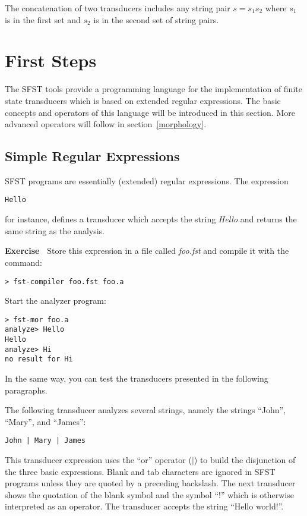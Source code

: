 \documentclass[11pt]{article}
\newenvironment{exercise}{

  \hrulefill\nopagebreak

  \textbf{Exercise~}}
{

  \nopagebreak\hrulefill\vspace{0.2cm}

}
\begin{document}
The concatenation of two transducers includes any string pair
$s=s_1s_2$ where $s_1$ is in the first set and $s_2$ is in the second
set of string pairs.


\section{First Steps\label{steps}}

The SFST tools provide a programming language for the implementation
of finite state transducers which is based on extended regular
expressions. The basic concepts and operators of this language will be
introduced in this section. More advanced operators will follow in
section~\ref{morphology}.


\subsection{Simple Regular Expressions}

SFST programs are essentially (extended) regular expressions. The expression

\begin{verbatim}
Hello
\end{verbatim}

for instance, defines a transducer which accepts the string
\emph{Hello} and returns the same string as the analysis.

\begin{exercise}
  Store this expression in a file called \emph{foo.fst} and compile it
with the command:

\begin{verbatim}
> fst-compiler foo.fst foo.a
\end{verbatim}

Start the analyzer program:

\begin{verbatim}
> fst-mor foo.a
analyze> Hello
Hello
analyze> Hi
no result for Hi
\end{verbatim}

In the same way, you can test the transducers presented in
the following paragraphs.
\end{exercise}

The following transducer analyzes several strings, namely the strings
``John'', ``Mary'', and ``James'':

\begin{verbatim}
John | Mary | James 
\end{verbatim}
This transducer expression uses the ``or'' operator ($|$) to build the
disjunction of the three basic expressions.  Blank and tab characters
are ignored in SFST programs unless they are quoted by a preceding
backslash.  The next transducer shows the quotation of the blank
symbol and the symbol ``!'' which is otherwise interpreted as an
operator. The transducer accepts the string ``Hello world!''.
\end{document}

